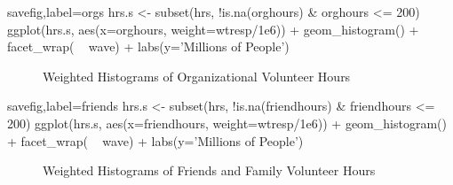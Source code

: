 \documentclass{article}
\begin{document}
\begin{Rcode}{savefig,label=orgs}
hrs.s <- subset(hrs, !is.na(orghours) & orghours <= 200)
ggplot(hrs.s, aes(x=orghours, weight=wtresp/1e6)) + geom_histogram() + facet_wrap( ~ wave) + labs(y='Millions of People')
\end{Rcode}

\begin{figure}[ht]
\centering
{}
\caption{Weighted Histograms of Organizational Volunteer Hours}
\end{figure}

\begin{Rcode}{savefig,label=friends}
hrs.s <- subset(hrs, !is.na(friendhours) & friendhours <= 200)
ggplot(hrs.s, aes(x=friendhours, weight=wtresp/1e6)) + geom_histogram() + facet_wrap( ~ wave) + labs(y='Millions of People')
\end{Rcode}

\begin{figure}[ht]
\centering
{}
\caption{Weighted Histograms of Friends and Family Volunteer Hours}
\end{figure}
\end{document}
